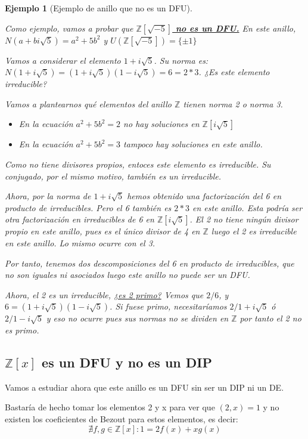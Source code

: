 \documentclass[11pt, a4paper, titlepage]{article}
\newif\IfInSansMode
\providecommand{\ent}{\mathbb{Z}}
\theoremstyle{theorem-style}
\theoremstyle{definition-style}
\theoremstyle{remark-style}
\theoremstyle{example-style}
\newtheorem{ejemplo}{Ejemplo}[section]
\begin{document}
\begin{ejemplo}[Ejemplo de anillo que no es un DFU] $\quad$

Como ejemplo, vamos a probar que \textbf{\underline{$\ent[\sqrt{-5}]$ no es un DFU.}} En este anillo, $N(a+bi\sqrt5) = a^2 + 5b^2$ y $U(\ent[\sqrt{-5}])= \{\pm 1\}$

Vamos a considerar el elemento $1+i\sqrt5$. Su norma es: $N(1+i\sqrt5) = (1+i\sqrt5)(1-i\sqrt5) = 6 = 2 * 3$. ¿Es este elemento irreducible?

Vamos a plantearnos qué elementos del anillo $\ent$ tienen norma 2 o norma 3.
\begin{itemize}
	\item En la ecuación $a^2+5b^2= 2$ no hay soluciones en $\ent[i\sqrt5]$
	\item En la ecuación $a^2+5b^2 = 3$ tampoco hay soluciones en este anillo.
\end{itemize}
	Como no tiene divisores propios, entoces este elemento es irreducible. Su conjugado, por el mismo motivo, también es un irreducible.

	Ahora, por la norma de $1+i\sqrt5$ hemos obtenido una factorización del 6 en producto de irreducibles. Pero el 6 también es $2*3$ en este anillo. Esta podría ser otra factorización en irreducibles de 6 en $\ent [i\sqrt5]$. El 2 no tiene ningún divisor propio en este anillo, pues es el único divisor de 4 en $\ent$ luego el 2 es irreducible en este anillo. Lo mismo ocurre con el 3.

	Por tanto, tenemos dos descomposiciones del 6 en producto de irreducibles, que no son iguales ni asociados luego este anillo no puede ser un DFU.

	Ahora, el 2 es un irreducible, \underline{¿es 2 primo?} Vemos que $2/6$, y $6 = (1+i\sqrt5)(1-i\sqrt5)$. Si fuese primo, necesitaríamos $2/1+i\sqrt5$ ó $2/1-i\sqrt5$ y eso no ocurre pues sus normas no se dividen en $\ent$ por tanto el 2 no es primo.
\end{ejemplo}

\subsection{$\ent[x]$ es un DFU y no es un DIP}

Vamos a estudiar ahora que este anillo es un DFU sin ser un DIP ni un DE.

Bastaría de hecho tomar los elementos 2 y x para ver que $(2,x) = 1$ y no existen los coeficientes de Bezout para estos elementos, es decir:
\[
\nexists f,g \in \ent[x] : 1 = 2f(x)+ xg(x)
\]
\end{document}
